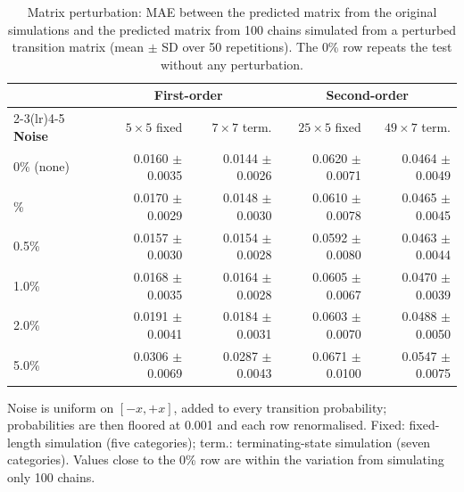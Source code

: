 \begin{table}[htbp]
\centering
\small
\caption{Matrix perturbation: MAE between the predicted matrix from the original simulations and the predicted matrix from 100 chains simulated from a perturbed transition matrix (mean $\pm$ SD over 50 repetitions). The 0\% row repeats the test without any perturbation.}
\label{tab:perturbation}
\setlength{\tabcolsep}{3pt}
\begin{tabular*}{\linewidth}{@{\extracolsep{\fill}}lrrrr}
\toprule
 & \multicolumn{2}{c}{\textbf{First-order}} & \multicolumn{2}{c}{\textbf{Second-order}} \\
\cmidrule(lr){2-3}\cmidrule(lr){4-5}
\textbf{Noise} & $5\times5$ fixed & $7\times7$ term. & $25\times5$ fixed & $49\times7$ term. \\
\midrule
0\% (none) & 0.0160 $\pm$ 0.0035 & 0.0144 $\pm$ 0.0026 & 0.0620 $\pm$ 0.0071 & 0.0464 $\pm$ 0.0049 \\
\addlinespace
0.1\% & 0.0170 $\pm$ 0.0029 & 0.0148 $\pm$ 0.0030 & 0.0610 $\pm$ 0.0078 & 0.0465 $\pm$ 0.0045 \\
0.5\% & 0.0157 $\pm$ 0.0030 & 0.0154 $\pm$ 0.0028 & 0.0592 $\pm$ 0.0080 & 0.0463 $\pm$ 0.0044 \\
1.0\% & 0.0168 $\pm$ 0.0035 & 0.0164 $\pm$ 0.0028 & 0.0605 $\pm$ 0.0067 & 0.0470 $\pm$ 0.0039 \\
2.0\% & 0.0191 $\pm$ 0.0041 & 0.0184 $\pm$ 0.0031 & 0.0603 $\pm$ 0.0070 & 0.0488 $\pm$ 0.0050 \\
5.0\% & 0.0306 $\pm$ 0.0069 & 0.0287 $\pm$ 0.0043 & 0.0671 $\pm$ 0.0100 & 0.0547 $\pm$ 0.0075 \\
\bottomrule
\end{tabular*}
\par\smallskip
\begin{minipage}{\linewidth}\footnotesize
Noise is uniform on $[-x, +x]$, added to every transition probability; probabilities are then floored at 0.001 and each row renormalised. Fixed: fixed-length simulation (five categories); term.: terminating-state simulation (seven categories). Values close to the 0\% row are within the variation from simulating only 100 chains.
\end{minipage}
\end{table}
